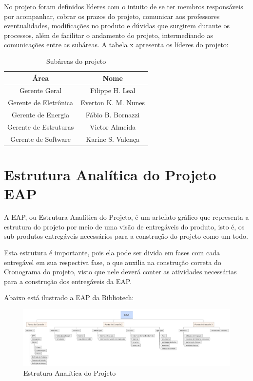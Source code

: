 No projeto foram definidos líderes com o intuito de se ter membros responsáveis por acompanhar, cobrar os prazos do projeto, comunicar aos professores eventualidades, modificações no produto e dúvidas que surgirem durante os processos, além de facilitar o andamento do projeto, intermediando as comunicações entre as subáreas. A tabela x apresenta os líderes do projeto:

\begin{table}[h]
\caption{Subáreas do projeto}
\centering
\begin{tabular}{|c|c|} \hline
\textbf{Área} & \textbf{Nome}\\ \hline                               
Gerente Geral & Filippe H. Leal\\ \hline
Gerente de Eletrônica & Everton K. M. Nunes\\ \hline
Gerente de Energia & Fábio B. Bornazzi\\ \hline
Gerente de Estruturas & Victor Almeida\\ \hline
Gerente de Software & Karine S. Valença\\ \hline
\end{tabular}
\end{table}

\section{Estrutura Analítica do Projeto EAP}
A EAP, ou Estrutura Analítica do Projeto, é um artefato gráfico que representa a estrutura do projeto por meio de uma visão de entregáveis do produto, isto é, os sub-produtos entregáveis necessários para a construção do projeto como um todo.

Esta estrutura é importante, pois ela pode ser divida em fases com cada entregável em sua respectiva fase, o que auxilia na construção correta do Cronograma do projeto, visto que nele deverá conter as atividades necessárias para a construção dos entregáveis da EAP.

Abaixo está ilustrado a EAP da Bibliotech:
\begin{figure}[!ht]
\centering
\includegraphics[scale=0.4, angle = 90]{figuras/eap}
\caption{Estrutura Analítica do Projeto}
\label{Estrutura Analítica do Projeto}
\end{figure}
\FloatBarrier


